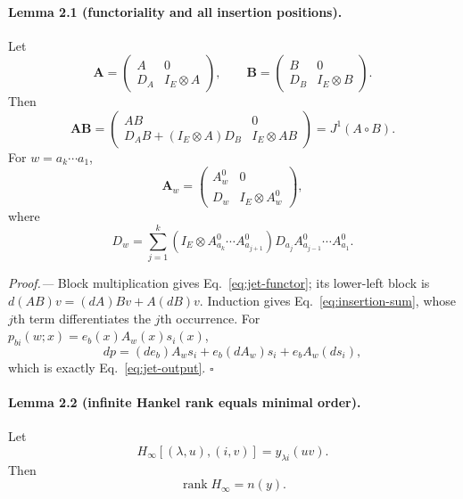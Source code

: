 \documentclass[aps,prl,reprint,superscriptaddress,nofootinbib]{revtex4-2}
\newcommand{\rank}{\operatorname{rank}}
\begin{document}
\paragraph{Lemma 2.1 (functoriality and all insertion positions).}
Let
\begin{equation}
 \bm A=\begin{pmatrix}A&0\\D_A&I_E\otimes A\end{pmatrix},
 \qquad
 \bm B=\begin{pmatrix}B&0\\D_B&I_E\otimes B\end{pmatrix}.
\end{equation}
Then
\begin{equation}
 \bm A\bm B=
 \begin{pmatrix}
 AB&0\\D_AB+(I_E\otimes A)D_B&I_E\otimes AB
 \end{pmatrix}=J^1(A\circ B).
 \label{eq:jet-functor}
\end{equation}
For $w=a_k\cdots a_1$,
\begin{equation}
 \bm A_w=
 \begin{pmatrix}A_w^0&0\\D_w&I_E\otimes A_w^0\end{pmatrix},
 \label{eq:word-jet}
\end{equation}
where
\begin{equation}
 D_w=\sum_{j=1}^k
 \left(I_E\otimes A_{a_k}^0\cdots A_{a_{j+1}}^0\right)
 D_{a_j}A_{a_{j-1}}^0\cdots A_{a_1}^0.
 \label{eq:insertion-sum}
\end{equation}

\emph{Proof.---}
Block multiplication gives Eq.~\eqref{eq:jet-functor}; its lower-left block is $d(AB)v=(dA)Bv+A(dB)v$.  Induction gives Eq.~\eqref{eq:insertion-sum}, whose $j$th term differentiates the $j$th occurrence.  For
$p_{bi}(w;x)=e_b(x)A_w(x)s_i(x)$,
\begin{equation}
 dp=(de_b)A_ws_i+e_b(dA_w)s_i+e_bA_w(ds_i),
 \label{eq:full-chain}
\end{equation}
which is exactly Eq.~\eqref{eq:jet-output}. \hfill$\square$

\paragraph{Lemma 2.2 (infinite Hankel rank equals minimal order).}
Let
\begin{equation}
 H_\infty[(\lambda,u),(i,v)]=y_{\lambda i}(uv).
 \label{eq:infinite-H}
\end{equation}
Then
\begin{equation}
 \rank H_\infty=n(y).
 \label{eq:hankel-rank-theorem}
\end{equation}
\end{document}
